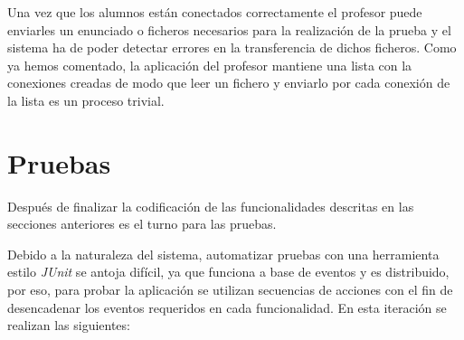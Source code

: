 Una vez que los alumnos están conectados correctamente el profesor puede enviarles un enunciado o ficheros necesarios para la realización de la prueba y el sistema ha de poder detectar errores en la transferencia de dichos ficheros. Como ya hemos comentado, la aplicación del profesor mantiene una lista con la conexiones creadas de modo que leer un fichero y enviarlo por cada conexión de la lista es un proceso trivial.
\newline


\section{Pruebas}
\label{sec:iteracion1:pruebas}

Después de finalizar la codificación de las funcionalidades descritas en las secciones anteriores es el turno para las pruebas.
\newline

Debido a la naturaleza del sistema, automatizar pruebas con una herramienta estilo \emph{JUnit} se antoja difícil, ya que funciona a base de eventos y es distribuido, por eso, para probar la aplicación se utilizan secuencias de acciones con el fin de desencadenar los eventos requeridos en cada funcionalidad. En esta iteración se realizan las siguientes:


